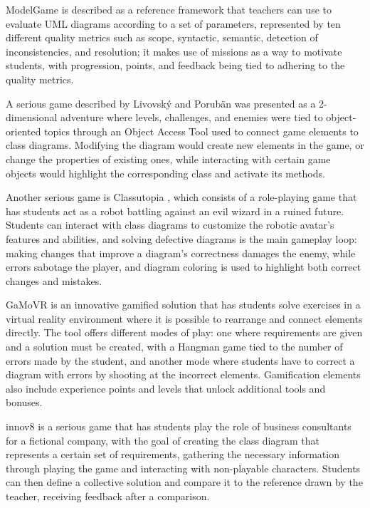ModelGame \cite{junior2021modelgame} is described as a reference framework that teachers can use to evaluate UML diagrams according to a set of parameters, represented by ten different quality metrics such as scope, syntactic, semantic, detection of inconsistencies, and resolution; it makes use of missions as a way to motivate students, with progression, points, and feedback being tied to adhering to the quality metrics.

A serious game described by Livovský and Porubän \cite{livovsky2014learning} was presented as a 2-dimensional adventure where levels, challenges, and enemies were tied to object-oriented topics through an Object Access Tool used to connect game elements to class diagrams. Modifying the diagram would create new elements in the game, or change the properties of existing ones, while interacting with certain game objects would highlight the corresponding class and activate its methods.

Another serious game is Classutopia \cite{marin2018learning, larenas2018classutopia}, which consists of a role-playing game that has students act as a robot battling against an evil wizard in a ruined future. Students can interact with class diagrams to customize the robotic avatar's features and abilities, and solving defective diagrams is the main gameplay loop: making changes that improve a diagram's correctness damages the enemy, while errors sabotage the player, and diagram coloring is used to highlight both correct changes and mistakes.

GaMoVR \cite{yigitbas2022gamification, yigitbas2023design} is an innovative gamified solution that has students solve exercises in a virtual reality environment where it is possible to rearrange and connect elements directly. The tool offers different modes of play: one where requirements are given and a solution must be created, with a Hangman game tied to the number of errors made by the student, and another mode where students have to correct a diagram with errors by shooting at the incorrect elements. Gamification elements also include experience points and levels that unlock additional tools and bonuses.

innov8 \cite{boughzala2017feedback} is a serious game that has students play the role of business consultants for a fictional company, with the goal of creating the class diagram that represents a certain set of requirements, gathering the necessary information through playing the game and interacting with non-playable characters. Students can then define a collective solution and compare it to the reference drawn by the teacher, receiving feedback after a comparison. 


